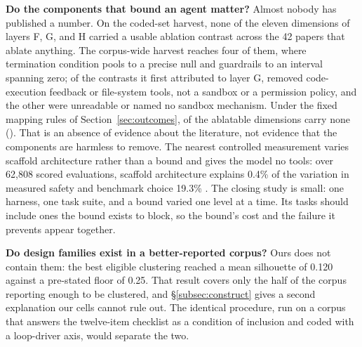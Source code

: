 \textbf{Do the components that bound an agent matter?} Almost nobody has published a number. On the
coded-set harvest, none of the eleven dimensions of layers F, G, and H carried a usable ablation contrast
across the 42 papers that ablate anything. The corpus-wide harvest reaches four of them, where
termination condition pools to a precise null and guardrails to an interval spanning zero; of the
\rqPreRuleGContrasts{} contrasts it first attributed to layer G, \rqPreRuleGRemapped{} removed
code-execution feedback or file-system tools, not a sandbox or a permission policy, and the other
\rqPreRuleGDropped{} were unreadable or named no sandbox mechanism. Under the
fixed mapping rules of Section~\ref{sec:outcomes}, \rqZeroDimCount{} of the
\rqAblatableDimCount{} ablatable dimensions carry none (\rqZeroDimList). That is an absence of evidence about the literature, not evidence that the components are
harmless to remove.
The nearest controlled measurement varies scaffold architecture rather than a bound and gives the
model no tools: over 62,808 scored evaluations, scaffold architecture explains 0.4\% of the variation
in measured safety and benchmark choice 19.3\% \citep{safetyscaffolding2026}.
The closing study is small: one harness, one task suite, and a bound varied one level
at a time. Its tasks should include ones the bound exists to block, so the bound's cost and the
failure it prevents appear together.

\textbf{Do design families exist in a better-reported corpus?} Ours does not contain them: the best
eligible clustering reached a mean silhouette of 0.120 against a pre-stated floor of 0.25. That result
covers only the half of the corpus reporting enough to be clustered, and \S\ref{subsec:construct} gives a
second explanation our cells cannot rule out. The identical procedure, run on a corpus that answers
the twelve-item checklist as a condition of inclusion and coded with a loop-driver axis, would separate
the two.
